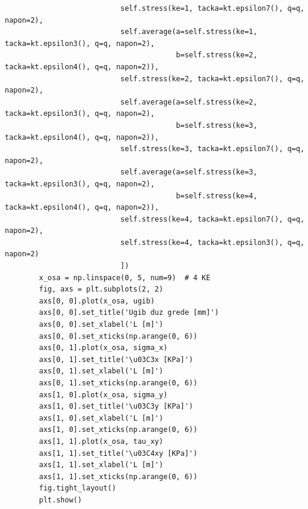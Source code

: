 \documentclass[11pt, a4paper]{article}
\begin{document}
\begin{lstlisting}
                           self.stress(ke=1, tacka=kt.epsilon7(), q=q, napon=2),
                           self.average(a=self.stress(ke=1, tacka=kt.epsilon3(), q=q, napon=2),
                                        b=self.stress(ke=2, tacka=kt.epsilon4(), q=q, napon=2)),
                           self.stress(ke=2, tacka=kt.epsilon7(), q=q, napon=2),
                           self.average(a=self.stress(ke=2, tacka=kt.epsilon3(), q=q, napon=2),
                                        b=self.stress(ke=3, tacka=kt.epsilon4(), q=q, napon=2)),
                           self.stress(ke=3, tacka=kt.epsilon7(), q=q, napon=2),
                           self.average(a=self.stress(ke=3, tacka=kt.epsilon3(), q=q, napon=2),
                                        b=self.stress(ke=4, tacka=kt.epsilon4(), q=q, napon=2)),
                           self.stress(ke=4, tacka=kt.epsilon7(), q=q, napon=2),
                           self.stress(ke=4, tacka=kt.epsilon3(), q=q, napon=2)
                           ])
        x_osa = np.linspace(0, 5, num=9)  # 4 KE
        fig, axs = plt.subplots(2, 2)
        axs[0, 0].plot(x_osa, ugib)
        axs[0, 0].set_title('Ugib duz grede [mm]')
        axs[0, 0].set_xlabel('L [m]')
        axs[0, 0].set_xticks(np.arange(0, 6))
        axs[0, 1].plot(x_osa, sigma_x)
        axs[0, 1].set_title('\u03C3x [KPa]')
        axs[0, 1].set_xlabel('L [m]')
        axs[0, 1].set_xticks(np.arange(0, 6))
        axs[1, 0].plot(x_osa, sigma_y)
        axs[1, 0].set_title('\u03C3y [KPa]')
        axs[1, 0].set_xlabel('L [m]')
        axs[1, 0].set_xticks(np.arange(0, 6))
        axs[1, 1].plot(x_osa, tau_xy)
        axs[1, 1].set_title('\u03C4xy [KPa]')
        axs[1, 1].set_xlabel('L [m]')
        axs[1, 1].set_xticks(np.arange(0, 6))
        fig.tight_layout()
        plt.show()
\end{lstlisting}
\end{document}
